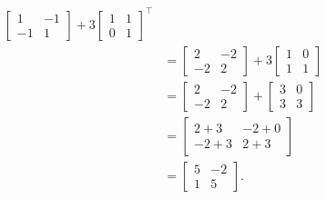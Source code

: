 \begin{questions}
\begin{solution}
\begin{align*}
\begin{bmatrix}
          1&-1\\
          -1&1
        \end{bmatrix}
       +3\begin{bmatrix}
         1&1\\
         0&1
       \end{bmatrix}^\intercal\\%
      &=
        \begin{bmatrix}
          2&-2\\
          -2&2
        \end{bmatrix}
      +3\begin{bmatrix}
        1&0\\
        1&1
      \end{bmatrix}\\
      &=\begin{bmatrix}
          2&-2\\
          -2&2
        \end{bmatrix}
      +\begin{bmatrix}
        3&0\\
        3&3
      \end{bmatrix}\\
      &=\begin{bmatrix}
        2+3&-2+0\\
        -2+3&2+3
      \end{bmatrix}\\
      &=\begin{bmatrix}
        5&-2\\
        1&5
      \end{bmatrix}.
    \end{align*}
  \end{solution}
\end{questions}

